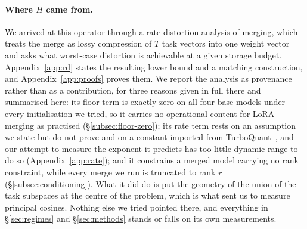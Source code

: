 \paragraph{Where $\bar H$ came from.} We arrived at this operator through a
rate-distortion analysis of merging, which treats the merge as lossy
compression of $T$ task vectors into one weight vector and asks what worst-case
distortion is achievable at a given storage budget. Appendix~\ref{app:rd}
states the resulting lower bound and a matching construction, and
Appendix~\ref{app:proofs} proves them. We report the analysis as provenance
rather than as a contribution, for three reasons given in full there and
summarised here: its floor term is exactly zero on all four base models under
every initialisation we tried, so it carries no operational content for LoRA
merging as practised (\S\ref{subsec:floor-zero}); its rate term rests on an
assumption we state but do not prove and on a constant imported from
TurboQuant~\citep{zandieh2025turboquant}, and our attempt to measure the
exponent it predicts has too little dynamic range to do so
(Appendix~\ref{app:rate}); and it constrains a merged model carrying no rank
constraint, while every merge we run is truncated to rank $r$
(\S\ref{subsec:conditioning}). What it did do is put the geometry of the union
of the task subspaces at the centre of the problem, which is what sent us to
measure principal cosines. Nothing else we tried pointed there, and everything
in \S\ref{sec:regimes} and \S\ref{sec:methods} stands or falls on its own
measurements.
